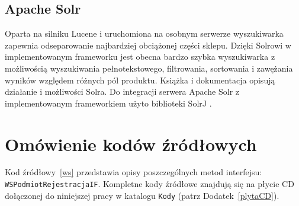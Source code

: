 \subsection{Apache Solr} 
Oparta na silniku Lucene i uruchomiona na osobnym serwerze wyszukiwarka zapewnia odseparowanie najbardziej obciążonej części sklepu. Dzięki Solrowi w implementowanym frameworku jest obecna bardzo szybka wyszukiwarka z możliwością wyszukiwania pełnotekstowego, filtrowania, sortowania i zawężania wyników względem różnych pól produktu. Książka \cite{solrbook} i dokumentacja \cite{Solr-doc} opisują działanie i możliwości Solra. Do integracji serwera Apache Solr z implementowanym frameworkiem użyto biblioteki SolrJ \cite{solrJ}.

\section{Omówienie kodów źródłowych}

{\color{dgray}
Kod źródłowy~\ref{ws} przedstawia opisy poszczególnych metod interfejsu: \texttt{WSPodmiotRejestracjaIF}. Kompletne
kody źródłowe znajdują się na płycie CD dołączonej do niniejszej pracy w katalogu \texttt{Kody} (patrz Dodatek~\ref{plytaCD}).
}


